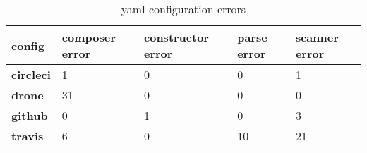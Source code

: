 \begin {table}[!htbp]

\caption{yaml configuration errors}
\label{table_yaml_errors}
\begin{tabular}{|l|l|l|l|}
\hline
\textbf{config} &  composer error &  constructor error &  parse error &  scanner error \\ \hline

\textbf{circleci} &               1 &                  0 &            0 &              1 \\ \hline
\textbf{drone   } &              31 &                  0 &            0 &              0 \\ \hline
\textbf{github  } &               0 &                  1 &            0 &              3 \\ \hline
\textbf{travis  } &               6 &                  0 &           10 &             21 \\ \hline

\end{tabular}
\end{table}
